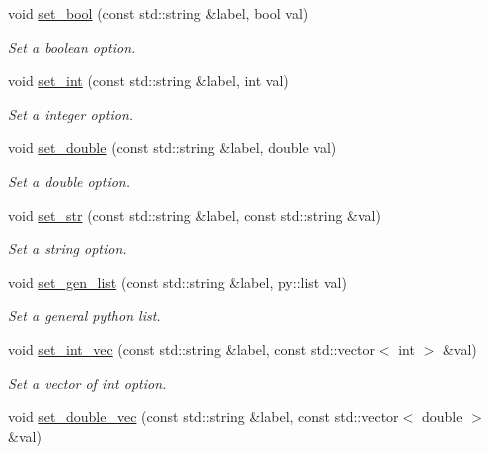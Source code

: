 \begin{DoxyCompactItemize}
void \mbox{\hyperlink{classforte_1_1_forte_options_a9290bcf94eb833ede825568bc30208e5}{set\+\_\+bool}} (const std\+::string \&label, bool val)
\begin{DoxyCompactList}\small\item\em Set a boolean option. \end{DoxyCompactList}\item 
void \mbox{\hyperlink{classforte_1_1_forte_options_a07cd921fa0a9b1705083e01f9251e860}{set\+\_\+int}} (const std\+::string \&label, int val)
\begin{DoxyCompactList}\small\item\em Set a integer option. \end{DoxyCompactList}\item 
void \mbox{\hyperlink{classforte_1_1_forte_options_aca265f33fa854251491eb37e7be9dd93}{set\+\_\+double}} (const std\+::string \&label, double val)
\begin{DoxyCompactList}\small\item\em Set a double option. \end{DoxyCompactList}\item 
void \mbox{\hyperlink{classforte_1_1_forte_options_a6f71291bb82d61dad15bda789e3a09e7}{set\+\_\+str}} (const std\+::string \&label, const std\+::string \&val)
\begin{DoxyCompactList}\small\item\em Set a string option. \end{DoxyCompactList}\item 
void \mbox{\hyperlink{classforte_1_1_forte_options_a20ac5982e5360de3ff5d527358ed0892}{set\+\_\+gen\+\_\+list}} (const std\+::string \&label, py\+::list val)
\begin{DoxyCompactList}\small\item\em Set a general python list. \end{DoxyCompactList}\item 
void \mbox{\hyperlink{classforte_1_1_forte_options_a2bb791d7d4f713d339d4f42a40ef6cb5}{set\+\_\+int\+\_\+vec}} (const std\+::string \&label, const std\+::vector$<$ int $>$ \&val)
\begin{DoxyCompactList}\small\item\em Set a vector of int option. \end{DoxyCompactList}\item 
void \mbox{\hyperlink{classforte_1_1_forte_options_a201555973acf31010e6a897f83baa7cd}{set\+\_\+double\+\_\+vec}} (const std\+::string \&label, const std\+::vector$<$ double $>$ \&val)

\end{DoxyCompactItemize}
